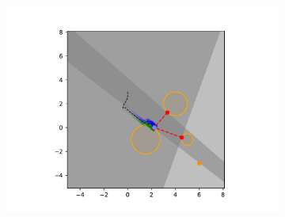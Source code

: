 \begin{figure}[H]
\begin{subfigure}{0.20\textwidth}
        \includegraphics[width=\textwidth]{figures/Simulations/sim1circles/frame_4.pdf}
    \end{subfigure}
    

\end{figure}
